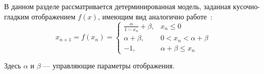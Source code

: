 \documentclass[a4paper, 14pt]{extreport}
\numberwithin{equation}{section}
\numberwithin{figure}{section}
\numberwithin{table}{section}
\begin{document}



	
		В данном разделе рассматривается детерминированная модель, заданная кусочно-гладким отображением $ f(x) $, имеющим вид аналогично работе~\cite{ShilnikovRulkov2003}:%
		\begin{equation}
		\label{model:eq1}
			x_{n + 1} = f(x_{n}) =
			\begin{cases}
				\frac{\alpha}{1 - x_{n}} + \beta, & x_{n} \leq 0 \\[3mm]
				\alpha + \beta, & 0 < x_{n} < \alpha + \beta \\[3mm]
				-1, & \alpha + \beta \leq x_{n}
			\end{cases}
		\end{equation} %

        Здесь $ \alpha $ и $ \beta $ --- управляющие параметры отображения.
\end{document}
